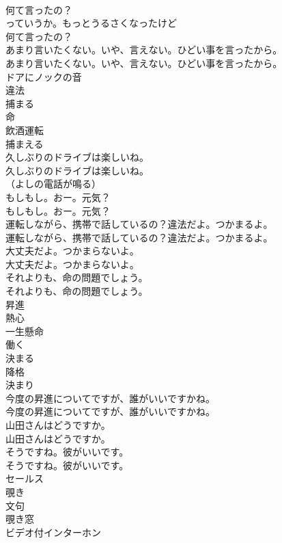 \documentclass[8pt]{extreport}
\begin{document}
\begin{CJK}{UTF8}{min}
\\	何て言ったの？	
\\	っていうか。もっとうるさくなったけど
\\	何て言ったの？ 
\\	あまり言いたくない。いや、言えない。ひどい事を言ったから。	
\\	あまり言いたくない。いや、言えない。ひどい事を言ったから。 
\\	ドアにノックの音
\\	違法
\\	捕まる
\\	命
\\	飲酒運転
\\	捕まえる
\\	久しぶりのドライブは楽しいね。	
\\	久しぶりのドライブは楽しいね。 
\\	（よしの電話が鳴る）	
\\	もしもし。おー。元気？	
\\	もしもし。おー。元気？ 
\\	運転しながら、携帯で話しているの？違法だよ。つかまるよ。	
\\	運転しながら、携帯で話しているの？違法だよ。つかまるよ。 
\\	大丈夫だよ。つかまらないよ。	
\\	大丈夫だよ。つかまらないよ。 
\\	それよりも、命の問題でしょう。	
\\	それよりも、命の問題でしょう。 
\\	昇進
\\	熱心
\\	一生懸命
\\	働く
\\	決まる
\\	降格
\\	決まり
\\	今度の昇進についてですが、誰がいいですかね。	
\\	今度の昇進についてですが、誰がいいですかね。 
\\	山田さんはどうですか。	
\\	山田さんはどうですか。 
\\	そうですね。彼がいいです。	
\\	そうですね。彼がいいです。 
\\	セールス
\\	覗き
\\	文句
\\	覗き窓
\\	ビデオ付インターホン

\end{CJK}
\end{document}
